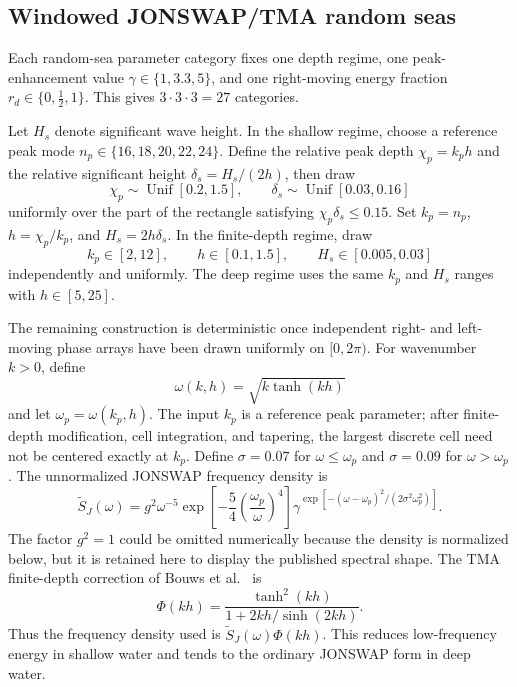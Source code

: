 \documentclass[10pt]{article}
\begin{document}
\subsection{Windowed JONSWAP/TMA random seas}

Each random-sea parameter category fixes one depth regime, one peak-enhancement value
$\gamma\in\{1,3.3,5\}$, and one right-moving energy fraction
$r_d\in\{0,\tfrac12,1\}$.  This gives $3\cdot3\cdot3=27$ categories.

Let $H_s$ denote significant wave height.  In the shallow regime, choose a
reference peak mode
$n_p\in\{16,18,20,22,24\}$.  Define the relative peak depth
$\chi_p=k_ph$ and the relative significant height
$\delta_s=H_s/(2h)$, then draw
\[
  \chi_p\sim\operatorname{Unif}[0.2,1.5],
  \qquad
  \delta_s\sim\operatorname{Unif}[0.03,0.16]
\]
uniformly over the part of the rectangle satisfying
$\chi_p\delta_s\leq0.15$.  Set
$k_p=n_p$, $h=\chi_p/k_p$, and $H_s=2h\delta_s$.
In the finite-depth regime, draw
\[
  k_p\in[2,12],\qquad h\in[0.1,1.5],\qquad H_s\in[0.005,0.03]
\]
independently and uniformly.  The deep regime uses the same $k_p$ and $H_s$
ranges with $h\in[5,25]$.

The remaining construction is deterministic once independent right- and
left-moving phase arrays have been drawn uniformly on $[0,2\pi)$.
For wavenumber $k>0$, define
\[
  \omega(k,h)=\sqrt{k\tanh(kh)}
\]
and let $\omega_p=\omega(k_p,h)$.  The input $k_p$ is a reference peak
parameter; after finite-depth modification, cell integration, and tapering,
the largest discrete cell need not be centered exactly at $k_p$.  Define
$\sigma=0.07$ for $\omega\leq\omega_p$ and $\sigma=0.09$ for
$\omega>\omega_p$.  The unnormalized JONSWAP frequency density
is~\cite{hasselmann1973}
\begin{equation}
  \widetilde S_J(\omega)
  =
  g^2\omega^{-5}
  \exp\!\left[-\frac54\left(\frac{\omega_p}{\omega}\right)^4\right]
  \gamma^{
    \exp[-(\omega-\omega_p)^2/
      (2\sigma^2\omega_p^2)]
  }.
  \label{eq:jonswap}
\end{equation}
The factor $g^2=1$ could be omitted numerically because the density is
normalized below, but it is retained here to display the published spectral
shape.  The TMA finite-depth correction of Bouws et al.~\cite{bouws1985} is
\begin{equation}
  \Phi(kh)=
  \frac{\tanh^2(kh)}
       {1+2kh/\sinh(2kh)}.
  \label{eq:tma}
\end{equation}
Thus the frequency density used is
$\widetilde S_J(\omega)\Phi(kh)$.  This reduces low-frequency energy in
shallow water and tends to the ordinary JONSWAP form in deep water.
\end{document}
